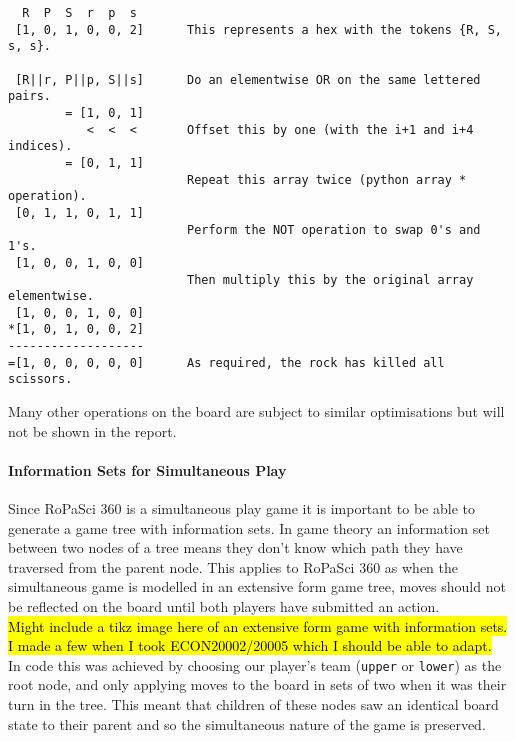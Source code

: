 \documentclass{article}
\begin{document}


\begin{center}
\begin{BVerbatim}
  R  P  S  r  p  s
 [1, 0, 1, 0, 0, 2]      This represents a hex with the tokens {R, S, s, s}.
 
 [R||r, P||p, S||s]      Do an elementwise OR on the same lettered pairs.
        = [1, 0, 1]
           <  <  <       Offset this by one (with the i+1 and i+4 indices).
        = [0, 1, 1]      
                         Repeat this array twice (python array * operation).
 [0, 1, 1, 0, 1, 1]
                         Perform the NOT operation to swap 0's and 1's.
 [1, 0, 0, 1, 0, 0]      
                         Then multiply this by the original array elementwise.
 [1, 0, 0, 1, 0, 0]
*[1, 0, 1, 0, 0, 2]
-------------------
=[1, 0, 0, 0, 0, 0]      As required, the rock has killed all scissors.
\end{BVerbatim}
\end{center}
Many other operations on the board are subject to similar optimisations but will not be shown in the report.
\paragraph{Information Sets for Simultaneous Play}
Since RoPaSci 360 is a simultaneous play game it is important to be able to generate a game tree with information sets. In game theory an information set between two nodes of a tree means they don't know which path they have traversed from the parent node. This applies to RoPaSci 360 as when the simultaneous game is modelled in an extensive form game tree, moves should not be reflected on the board until both players have submitted an action.\\[2mm]
\hl{Might include a tikz image here of an extensive form game with information sets. I made a few when I took ECON20002/20005 which I should be able to adapt.}\\[2mm]
In code this was achieved by choosing our player's team (\verb|upper| or \verb|lower|) as the root node, and only applying moves to the board in sets of two when it was their turn in the tree. This meant that children of these nodes saw an identical board state to their parent and so the simultaneous nature of the game is preserved.
\end{document}
